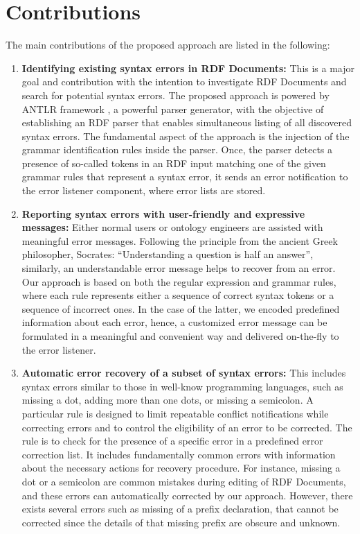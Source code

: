 

\section {Contributions}
The main contributions of the proposed approach are listed in the following:
\begin{enumerate}
	\item  {\bf Identifying existing syntax errors in RDF Documents:} This is a major goal and contribution with the intention to investigate RDF Documents and search for potential syntax errors. 
	The proposed approach is powered by ANTLR framework \cite{ANTLR:Website:Online}, a powerful parser generator, with the objective of establishing an RDF parser that enables simultaneous listing of all discovered syntax errors. 
	The fundamental aspect of the approach is the injection of the grammar identification rules inside the parser. 
	Once, the parser detects a presence of so-called tokens in an RDF input matching one of the given grammar rules that represent a syntax error, it sends an error notification to the error listener component, where error lists are stored.
	\item {\bf Reporting syntax errors with user-friendly and expressive messages:} Either normal users or ontology engineers are assisted with meaningful error messages. 
	Following the principle from the ancient Greek philosopher, Socrates: “Understanding a question is half an answer”\cite{Socrates:quote:Online}, similarly, an understandable error message helps to recover from an error. 
	Our approach is based on both the regular expression and grammar rules, where each rule represents either a sequence of correct syntax tokens or a sequence of incorrect ones. 
	In the case of the latter, we encoded  predefined information about each error, hence, a customized error message can be formulated in a meaningful and convenient way and delivered on-the-fly to the error listener.  
	\item {\bf Automatic error recovery of a subset of syntax errors:} This includes syntax errors similar to those in well-know programming languages, such as missing a dot, adding more than one dots, or missing a semicolon. 
	A particular rule is designed to limit repeatable conflict notifications while correcting errors and to control the eligibility of an error to be corrected. 
	The rule is to check for the presence of a specific error in a predefined error correction list.
	It includes fundamentally common errors with information about the necessary actions for recovery procedure. 
	For instance, missing a dot or a semicolon are common mistakes during editing of RDF Documents, and these errors can automatically corrected by our approach.
	However, there exists several errors such as missing of a prefix declaration, that cannot be corrected since the details of that missing prefix are obscure and unknown.     
\end{enumerate}

